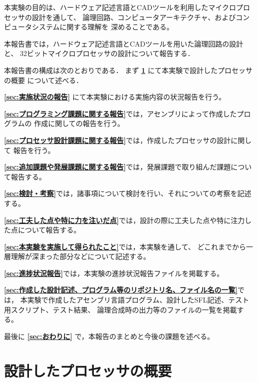 \documentclass{jarticle}[11pt]
\begin{document}
本実験の目的は、ハードウェア記述言語とCADツールを利用したマイクロプロセッサの設計を通して、
論理回路、コンピュータアーキテクチャ、およびコンピュータシステムに関する理解を
深めることである。

本報告書では，ハードウェア記述言語とCADツールを用いた論理回路の設計と、
32ビットマイクロプロセッサの設計について報告する．



本報告書の構成は次のとおりである．
まず 
{\bf \ref{sec:設計したプロセッサの概要}} にて本実験で設計したプロセッサの概要
について述べる．

{\bf \ref{sec:実施状況の報告}} にて本実験における実施内容の状況報告を行う。

{\bf \ref{sec:プログラミング課題に関する報告}}では，アセンブリによって作成したプログラムの
作成に関しての報告を行う。

{\bf \ref{sec:プロセッサ設計課題に関する報告}}では，作成したプロセッサの設計に関して
報告を行う。

{\bf \ref{sec:追加課題や発展課題に関する報告}}では，発展課題で取り組んだ課題について報告する。

{\bf \ref{sec:検討・考察}}では，諸事項について検討を行い、それについての考察を記述する。

{\bf \ref{sec:工夫した点や特に力を注いだ点}}では，設計の際に工夫した点や特に注力した点について報告する。

{\bf \ref{sec:本実験を実施して得られたこと}}では，本実験を通して、
どこれまでから一層理解が深まった部分などについて記述する。

{\bf \ref{sec:進捗状況報告}}では，本実験の進捗状況報告ファイルを掲載する。

{\bf \ref{sec:作成した設計記述、プログラム等のリポジトリ名、ファイル名の一覧}}では，
本実験で作成したアセンブリ言語プログラム、設計したSFL記述、テスト用スクリプト、テスト結果、
論理合成時の出力等のファイルの一覧を掲載する。

最後に {\bf \ref{sec:おわりに}} で，本報告のまとめと今後の課題を述べる。





\section{設計したプロセッサの概要}
\label{sec:設計したプロセッサの概要}
\end{document}
